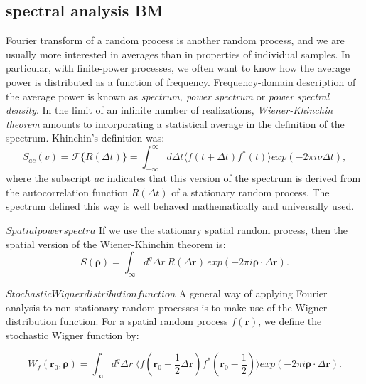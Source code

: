 \subsection{spectral analysis BM}
Fourier transform of a random process is another random process, and we are usually more interested in averages than in properties of individual samples.  In particular, with finite-power processes, we often want to know how the average power is distributed as a function of frequency.  Frequency-domain description of the average power is known as \textit{spectrum, power spectrum} or \textit{power spectral density}.
\newline
In the limit of an infinite number of realizations, \textit{Wiener-Khinchin theorem} amounts to incorporating a statistical average in the definition of the spectrum.  Khinchin's definition was:
\begin{equation}
S_{ac}(v) = \mathcal{F} \{ R(\Delta t) \} = \int_{-\infty}^{\infty} d \Delta t \langle f(t + \Delta t) f^{\ast} (t) \rangle exp(-2 \pi i\nu \Delta t), 
\end{equation}
where the subscript $\mathit{ac}$ indicates that this version of the spectrum is derived from the autocorrelation function $\mathit{R(\Delta t)}$ of a stationary random process.  The spectrum defined this way is well behaved mathematically and universally used.

\noindent
$\mathit{Spatial power spectra}$
If we use the stationary spatial random process, then the spatial version of the Wiener-Khinchin theorem is:
\begin{equation}
S(\mathbf{\rho}) = \int_{\infty} d^q \Delta r \: R(\Delta \mathbf{r}) \, exp(-2 \pi i \mathbf{\rho} \cdot \Delta \mathbf{r}).
\end{equation}

\noindent
$\mathit{Stochastic Wigner distribution function}$
A general way of applying Fourier analysis to non-stationary random processes is to make use of the Wigner distribution function.  For a spatial random process $f(\mathbf{r})$, we define the stochastic Wigner function by:

\begin{equation}
W_f (\mathbf{r}_0, \mathbf{\rho}) = \int_{\infty} d^{q} \Delta r \; \langle f(\mathbf{r}_0 + \frac{1}{2} \Delta \mathbf{r}) f^{\ast}(\mathbf{r}_0 - \frac{1}{2}) \rangle
exp(-2 \pi i \mathbf{\rho} \cdot \Delta \mathbf{r}).
\end{equation}

